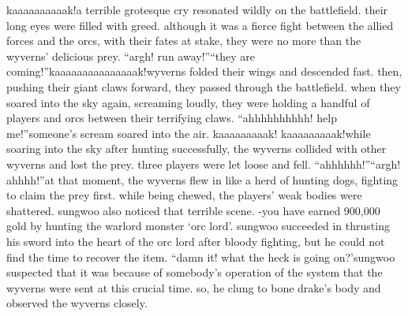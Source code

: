 kaaaaaaaaaak!a terrible grotesque cry resonated wildly on the battlefield.
their long eyes were filled with greed.
although it was a fierce fight between the allied forces and the orcs, with their fates at stake, they were no more than the wyverns’ delicious prey.
“argh! run away!”“they are coming!”kaaaaaaaaaaaaaaak!wyverns folded their wings and descended fast.
 then, pushing their giant claws forward, they passed through the battlefield.
 when they soared into the sky again, screaming loudly, they were holding a handful of players and orcs between their terrifying claws.
“ahhhhhhhhhh! help me!”someone’s scream soared into the air.
kaaaaaaaaak! kaaaaaaaaak!while soaring into the sky after hunting successfully, the wyverns collided with other wyverns and lost the prey.
 three players were let loose and fell.
“ahhhhhh!”“argh! ahhhh!”at that moment, the wyverns flew in like a herd of hunting dogs, fighting to claim the prey first.
while being chewed, the players’ weak bodies were shattered.
sungwoo also noticed that terrible scene.
-you have earned 900,000 gold by hunting the warlord monster ‘orc lord’.
sungwoo succeeded in thrusting his sword into the heart of the orc lord after bloody fighting, but he could not find the time to recover the item.
“damn it! what the heck is going on?’sungwoo suspected that it was because of somebody’s operation of the system that the wyverns were sent at this crucial time.
 so, he clung to bone drake’s body and observed the wyverns closely.

